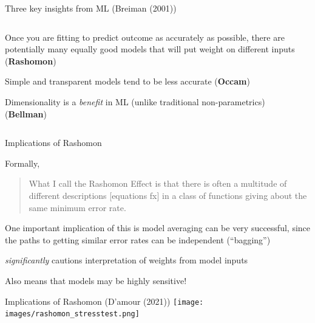 \documentclass[notes,11pt, aspectratio=169]{beamer}
\newenvironment{wideitemize}{\itemize\addtolength{\itemsep}{10pt}}{\enditemize}
\begin{document}
\begin{frame}{Three key insights from ML (Breiman (2001))}
  \begin{columns}[onlytextwidth, T] %
    \begin{column}{.5\textwidth}
  \begin{wideitemize}
  \item<1-> Once you are fitting to predict outcome as accurately as
    possible, there are potentially many equally good models that will put weight on different inputs
    (\textbf{Rashomon})
  \item<2-> Simple and transparent models tend to be less accurate (\textbf{Occam})
  \item<3-> Dimensionality is a \emph{benefit} in ML (unlike traditional non-parametrics) (\textbf{Bellman})
  \end{wideitemize}
      \end{column}%
      \hfill%
      \begin{column}{.4\textwidth}
      \end{column}%
    \end{columns}
\end{frame}

\begin{frame}{Implications of Rashomon}
  \begin{wideitemize}
  \item Formally,
    \begin{quote} What I call the Rashomon Effect is
      that there is often a multitude of different descriptions
      [equations fx] in a class of functions giving about the same
      minimum error rate.
    \end{quote}
  \item One important implication of this is model averaging can be
    very successful, since the paths to getting similar error rates
    can be independent (``bagging'')
  \item \emph{significantly} cautions interpretation of weights from
    model inputs
  \item Also means that models may be highly sensitive!
  \end{wideitemize}
\end{frame}

\begin{frame}{Implications of Rashomon (D'amour (2021))} 
  \texttt{[image: images/rashomon\_stresstest.png]}
\end{frame}
\end{document}
